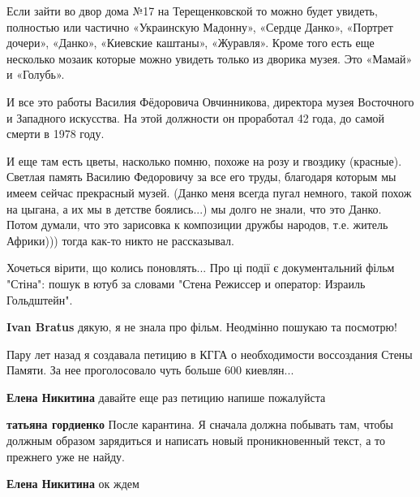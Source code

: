 \begin{itemize}
Если зайти во двор дома №17 на Терещенковской то можно будет увидеть, полностью
или частично «Украинскую Мадонну», «Сердце Данко», «Портрет дочери», «Данко»,
«Киевские каштаны», «Журавля». Кроме того есть еще несколько мозаик которые
можно увидеть только из дворика музея. Это «Мамай» и «Голубь».

И все это работы Василия Фёдоровича Овчинникова, директора музея Восточного и
Западного искусства. На этой должности он проработал 42 года, до самой смерти в
1978 году.

\begin{itemize} %

И еще там есть цветы, насколько помню, похоже на розу и гвоздику (красные).
Светлая память Василию Федоровичу за все его труды, благодаря которым мы имеем
сейчас прекрасный музей. (Данко меня всегда пугал немного, такой похож на
цыгана, а их мы в детстве боялись...) мы долго не знали, что это Данко. Потом
думали, что это зарисовка к композиции дружбы народов, т.е. житель Африки)))
тогда как-то никто не рассказывал.

\end{itemize} %


Хочеться вірити, що колись поновлять... Про ці події є документальний фільм
"Стіна": пошук в ютуб за словами "Стена Режиссер и оператор: Израиль
Гольдштейн".

\begin{itemize} %
\textbf{Ivan Bratus} дякую, я не знала про фільм. Неодмінно пошукаю та посмотрю!
\end{itemize} %


Пару лет назад я создавала петицию в КГГА о необходимости воссоздания Стены
Памяти. За нее проголосовало чуть больше 600 киевлян...

\begin{itemize} %
\textbf{Елена Никитина} давайте еще раз петицию напише пожалуйста

\textbf{татьяна гордиенко} После карантина. Я сначала должна побывать там, чтобы должным образом зарядиться и написать новый проникновенный текст, а то прежнего уже не найду.

\textbf{Елена Никитина} ок ждем
\end{itemize} %



\end{itemize}
